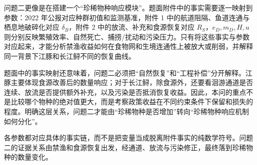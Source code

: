 问题二更像是在搭建一个“珍稀物种响应模块”。题面附件中的事实需要逐一映射到参数：2022 年公报对应种群初值和监测基准，附件 1 中的航道阻隔、鱼道连通与栖息地破碎化对应 \(\delta_B\)，附件 2 中的放流、补充和食源恢复对应 \(R_S\)，\(e_D,m_D,H,u\) 则分别反映繁殖效率、自然死亡、捕捞/扰动和污染压力。只有将这些事实与参数对应起来，才能分析禁渔收益如何在食物网和生境连通性上被放大或削弱，并解释同一背景下江豚和长江鲟不同的恢复曲线\cite{report2022}。

题面中的事实映射还意味着，问题二必须把“自然恢复”和“工程补偿”分开解释。江豚主要体现食源改善后的数量响应；对于长江鲟，除食源外，还要看洄游通道是否连续、放流是否提供额外补充，以及污染是否抵消恢复收益。因此，本问的重点不是比较哪个物种的绝对值更大，而是考察政策收益在不同约束条件下保留和损失的程度。明确这层关系，问题二才能由“珍稀物种是否增加”转向“珍稀物种响应机制如何分化”。

各参数都对应具体的事实链，而不是把变量当成脱离附件事实的纯数学符号。问题二的证据关系由禁渔和食源恢复出发，经通道、放流与污染修正，最终落到珍稀物种的数量变化。
